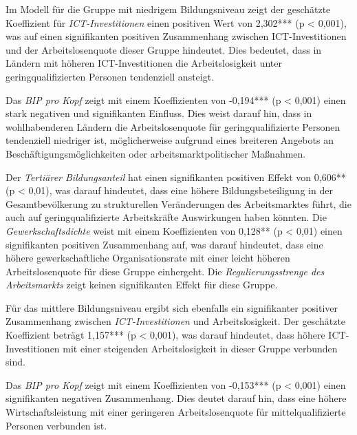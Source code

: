 

Im Modell für die Gruppe mit niedrigem Bildungsniveau zeigt der geschätzte Koeffizient 
für \textit{\ac{ICT}-Investitionen} einen positiven Wert von 2,302*** (p < 0,001), was auf 
einen signifikanten positiven Zusammenhang zwischen \ac{ICT}-Investitionen und der 
Arbeitslosenquote dieser Gruppe hindeutet. Dies bedeutet, dass in Ländern mit 
höheren \ac{ICT}-Investitionen die Arbeitslosigkeit unter geringqualifizierten Personen 
tendenziell ansteigt.

Das \textit{\ac{BIP} pro Kopf} zeigt mit einem Koeffizienten von -0,194*** (p < 0,001) 
einen stark negativen und signifikanten Einfluss. Dies weist darauf hin, dass in wohlhabenderen 
Ländern die Arbeitslosenquote für geringqualifizierte Personen tendenziell niedriger ist, 
möglicherweise aufgrund eines breiteren Angebots an Beschäftigungsmöglichkeiten oder 
arbeitsmarktpolitischer Maßnahmen.

Der \textit{Tertiärer Bildungsanteil} hat einen signifikanten positiven Effekt von 0,606** 
(p < 0,01), was darauf hindeutet, dass eine höhere Bildungsbeteiligung in der Gesamtbevölkerung 
zu strukturellen Veränderungen des Arbeitsmarktes führt, die auch auf geringqualifizierte Arbeitskräfte 
Auswirkungen haben könnten. Die \textit{Gewerkschaftsdichte} weist mit einem Koeffizienten von 0,128** 
(p < 0,01) einen signifikanten positiven Zusammenhang auf, was darauf hindeutet, dass eine höhere 
gewerkschaftliche Organisationsrate mit einer leicht höheren Arbeitslosenquote für diese Gruppe 
einhergeht. Die \textit{Regulierungsstrenge des Arbeitsmarkts} zeigt keinen signifikanten Effekt für 
diese Gruppe.

Für das mittlere Bildungsniveau ergibt sich ebenfalls ein signifikanter positiver Zusammenhang 
zwischen \textit{\ac{ICT}-Investitionen} und Arbeitslosigkeit. Der geschätzte Koeffizient beträgt 
1,157*** (p < 0,001), was darauf hindeutet, dass höhere \ac{ICT}-Investitionen mit einer steigenden 
Arbeitslosigkeit in dieser Gruppe verbunden sind.

Das \textit{\ac{BIP} pro Kopf} zeigt mit einem Koeffizienten von -0,153*** (p < 0,001) einen 
signifikanten negativen Zusammenhang. Dies deutet darauf hin, dass eine höhere 
Wirtschaftsleistung mit einer geringeren Arbeitslosenquote für mittelqualifizierte Personen 
verbunden ist.

